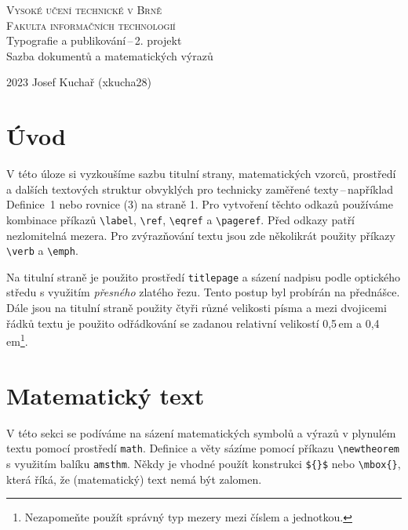 \documentclass[twocolumn,11pt]{article}
\theoremstyle{plain}
\theoremstyle{plain}
\begin{document}
\begin{titlepage}
\begin{center}
\textsc{\Huge Vysoké učení technické v Brně\\\vspace{0.5em}\huge Fakulta informačních technologií}\\
\LARGE
Typografie a publikování\,--\,2. projekt\\
\vspace{0.4em}
Sazba dokumentů a matematických výrazů
\end{center}
{\Large 2023 \hfill Josef Kuchař (xkucha28)}
\end{titlepage}
\clearpage

\section*{Úvod}
V této úloze si vyzkoušíme sazbu titulní strany, matematických vzorců,
prostředí a dalších textových struktur obvyklých pro technicky zaměřené
texty\,--\,například Definice~1 nebo rovnice (3) na straně 1. Pro vytvoření těchto
odkazů používáme kombinace příkazů \verb|\label|, \verb|\ref|, \verb|\eqref| a \verb|\pageref|.
Před odkazy patří nezlomitelná mezera. Pro zvýrazňování textu jsou zde
několikrát použity příkazy \verb|\verb| a \verb|\emph|.

Na titulní straně je použito
prostředí \verb|titlepage| a sázení nadpisu podle optického středu s využitím
\emph{přesného} zlatého řezu. Tento postup byl probírán na přednášce. Dále jsou
na titulní straně použity čtyři různé velikosti písma a mezi dvojicemi
řádků textu je použito odřádkování se zadanou relativní velikostí 0,5\,em
a 0,4\,em\footnote{Nezapomeňte použít správný typ mezery mezi číslem a jednotkou.}.

\section{Matematický text}
V této sekci se podíváme na sázení matematických symbolů a výrazů v plynulém
textu pomocí prostředí \verb|math|. Definice a věty sázíme pomocí příkazu \verb|\newtheorem|
s využitím balíku \verb|amsthm|. Někdy je vhodné použít konstrukci \verb|${}$| nebo \verb|\mbox{}|,
která říká, že (matematický) text nemá být zalomen.
\end{document}
